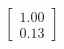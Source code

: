 \documentclass[preview]{standalone}
\begin{document}
\begin{align*}
\begin{bmatrix} 1.00 \\ 0.13 \end{bmatrix}
\end{align*}
\end{document}
